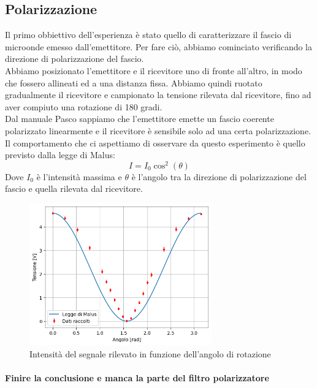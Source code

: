 \documentclass[letterpaper,12pt]{article}
\begin{document}
\subsection{Polarizzazione}

Il primo obbiettivo dell'esperienza è stato quello di caratterizzare il fascio di microonde emesso dall'emettitore.
Per fare ciò, abbiamo cominciato verificando la direzione di polarizzazione del fascio. \\
Abbiamo posizionato l'emettitore e il ricevitore uno di fronte all'altro, in modo che fossero
allineati ed a una distanza fissa. Abbiamo quindi ruotato gradualmente il ricevitore e campionato
la tensione rilevata dal ricevitore, fino ad aver compiuto una rotazione di 180 gradi.\\
Dal manuale Pasco sappiamo che l'emettitore emette un fascio coerente polarizzato linearmente
e il ricevitore è sensibile solo ad una certa polarizzazione. Il comportamento che ci aspettiamo
di osservare da questo esperimento è quello previsto dalla legge di Malus:
\begin{equation}
	I = I_0 \cos^2(\theta)
	\label{eq:malus}
\end{equation}
Dove $I_0$ è l'intensità massima e $\theta$ è l'angolo tra la direzione di polarizzazione del fascio e quella rilevata dal ricevitore.\\

\begin{figure}[h!]
	\centering
	\includegraphics[width = 0.7\textwidth]{polarizzazione.png}
	\caption{Intensità del segnale rilevato in funzione dell'angolo di rotazione}
	\label{fig:polarizzazione}
\end{figure}
\paragraph*{Finire la conclusione e manca la parte del filtro polarizzatore}
\end{document}
